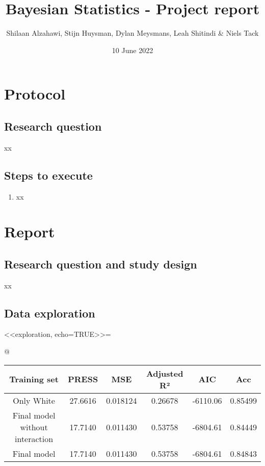 \documentclass[10pt, a4paper]{report}
\title{Bayesian Statistics - Project report}
\author{Shilaan Alzahawi, Stijn Huysman, Dylan Meysmans, Leah Shitindi & Niels Tack}
\date{10 June 2022}
\begin{document}

\tableofcontents
\newpage
\section{Protocol}
\subsection{Research question}
xx

\subsection{Steps to execute}


\begin{enumerate}
    \itemsep0em
\item xx
\end{enumerate}

\newpage
\section{Report}
\subsection{Research question and study design}
xx

\subsection{Data exploration}

<<exploration, echo=TRUE>>=


@

\begin{center}
\begin{tabular}{ c | c | c | c | c | c}
Training set                         & PRESS     & MSE       & Adjusted R²   & AIC       & Acc\\ \hline
Only White                           & 27.6616   & 0.018124  & 0.26678       & -6110.06  & 0.85499\\
Final model without interaction      & 17.7140   & 0.011430  & 0.53758       & -6804.61  &  0.84449  \\
Final model                          & 17.7140   & 0.011430  & 0.53758       & -6804.61  & 0.84843 \\
\end{tabular}
\end{center}
\end{document}
